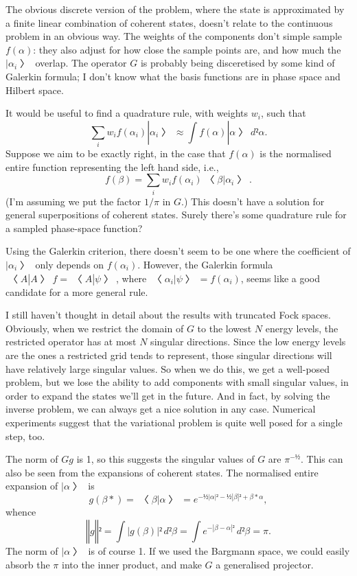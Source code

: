 The obvious discrete version of the problem, where the state is approximated by a finite linear combination of coherent states, doesn't relate to the continuous problem in an obvious way.  The weights of the components don't simple sample $f(α)$: they also adjust for how close the sample points are, and how much the $|α_i〉$ overlap.  The operator $G$ is probably being disceretised by some kind of Galerkin formula; I don't know what the basis functions are in phase space and Hilbert space.

It would be useful to find a quadrature rule, with weights $w_i$, such that 
$$∑_i w_if(α_i)|α_i〉≈\int f(α)|α〉d²α.$$
Suppose we aim to be exactly right, in the case that $f(α)$ is the normalised entire function representing the left hand side, i.e.,
$$f(β)=∑_i w_if(α_i)〈β|α_i〉.$$
(I'm assuming we put the factor $1/π$ in $G$.)  This doesn't have a solution for general superpositions of coherent states.  Surely there's some quadrature rule for a sampled phase-space function?

Using the Galerkin criterion, there doesn't seem to be one where the coefficient of $|α_i〉$ only depends on $f(α_i)$.  However, the Galerkin formula $〈A|A〉f=〈A|ψ〉$, where $〈α_i|ψ〉=f(α_i)$, seems like a good candidate for a more general rule.


I still haven't thought in detail about the results with truncated Fock spaces.  Obviously, when we restrict the domain of $G$ to the lowest $N$ energy levels, the restricted operator has at most $N$ singular directions.  Since the low energy levels are the ones a restricted grid tends to represent, those singular directions will have relatively large singular values.  So when we do this, we get a well-posed problem, but we lose the ability to add components with small singular values, in order to expand the states we'll get in the future.  And in fact, by solving the inverse problem, we can always get a nice solution in any case.  Numerical experiments suggest that the variational problem is quite well posed for a single step, too.

The norm of $Gg$ is 1, so this suggests the singular values of $G$ are $π^{-½}$.  This can also be seen from the expansions of coherent states.  The normalised entire expansion of $|α〉$ is
$$g(β*)=〈β|α〉=e^{-½|α|²-½|β|²+β*α},$$
whence
$$‖g‖²=\int |g(β)|²\,d²β=\int e^{-|β-α|²}\,d²β=π.$$
The norm of $|α〉$ is of course 1.  If we used the Bargmann space, we could easily absorb the $π$ into the inner product, and make $G$ a generalised projector.

